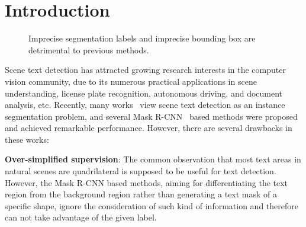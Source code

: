 \documentclass[10pt,twocolumn,letterpaper]{article}
\begin{document}
    \section{Introduction}\label{sec:introduction}
    \begin{figure}
  \footnotesize
  \centering
  \vspace{5pt}
  \caption{Imprecise segmentation labels and imprecise bounding box are detrimental to previous methods.}
  \label{fig:drawbacks}
\end{figure}

Scene text detection has attracted growing research interests in the computer vision community, due to its numerous practical applications in scene understanding, license plate recognition, autonomous driving, and document analysis, etc. Recently, many works~\cite{xie2018scene, lyu2018mask, huang2018mask} view scene text detection as an instance segmentation problem, and several Mask R-CNN~\cite{he2017mask} based methods were proposed and achieved remarkable performance. However, there are several drawbacks in these works:

\textbf{Over-simplified supervision}: The common observation that most text areas in natural scenes are quadrilateral is supposed to be useful for text detection. However, the Mask R-CNN based methods, aiming for differentiating the text region from the background region rather than generating a text mask of a specific shape, ignore the consideration of such kind of information and therefore can not take advantage of the given label.
\end{document}
